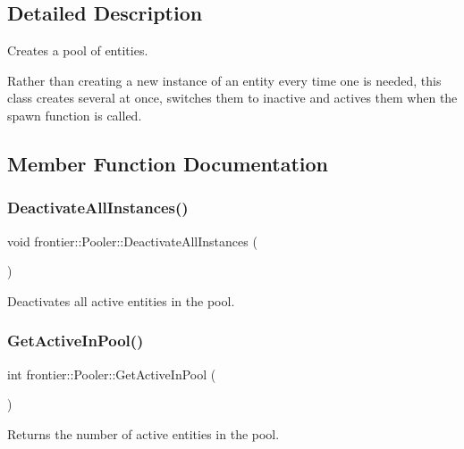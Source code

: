 \subsection{Detailed Description}
Creates a pool of entities. 

Rather than creating a new instance of an entity every time one is needed, this class creates several at once, switches them to inactive and actives them when the spawn function is called. 

\subsection{Member Function Documentation}
\mbox{\label{classfrontier_1_1_pooler_ad4dced5034fd806568b03f59f0bcb4a7}} 
\subsubsection{\texorpdfstring{Deactivate\+All\+Instances()}{DeactivateAllInstances()}}
{\footnotesize\ttfamily void frontier\+::\+Pooler\+::\+Deactivate\+All\+Instances (\begin{DoxyParamCaption}{ }\end{DoxyParamCaption})}



Deactivates all active entities in the pool. 

\mbox{\label{classfrontier_1_1_pooler_abce85fe89ac04c600e447d3b722f6fc2}} 
\subsubsection{\texorpdfstring{Get\+Active\+In\+Pool()}{GetActiveInPool()}}
{\footnotesize\ttfamily int frontier\+::\+Pooler\+::\+Get\+Active\+In\+Pool (\begin{DoxyParamCaption}{ }\end{DoxyParamCaption})}



Returns the number of active entities in the pool. 

